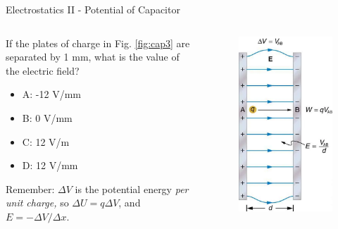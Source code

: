 \documentclass{beamer}
\begin{document}
\begin{frame}{Electrostatics II - Potential of Capacitor}
\small
\begin{columns}[T]
\begin{column}{0.5\textwidth}
If the plates of charge in Fig. \ref{fig:cap3} are separated by 1 mm, what is the value of the electric field?
\begin{itemize}
\item A: -12 V/mm
\item B: 0 V/mm
\item C: 12 V/m
\item D: 12 V/mm
\end{itemize}
\footnotesize
Remember: $\Delta V$ is the potential energy \textit{per unit charge,} so $\Delta U = q \Delta V$, and $E = -\Delta V / \Delta x$.
\end{column}
\begin{column}{0.275\textwidth}
\begin{figure}
\includegraphics[width=\textwidth]{figures/cap2.png}

\end{figure}
\end{column}
\end{columns}
\end{frame}
\end{document}
